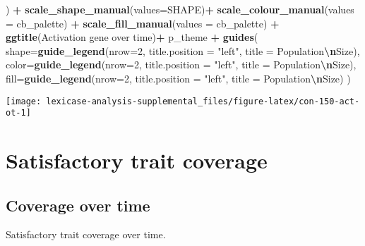 \documentclass[
]{book}
\newenvironment{Shaded}{\begin{snugshade}}{\end{snugshade}}
\newcommand{\AttributeTok}[1]{\textcolor[rgb]{0.13,0.29,0.53}{#1}}
\newcommand{\DecValTok}[1]{\textcolor[rgb]{0.00,0.00,0.81}{#1}}
\newcommand{\FunctionTok}[1]{\textcolor[rgb]{0.13,0.29,0.53}{\textbf{#1}}}
\newcommand{\NormalTok}[1]{#1}
\newcommand{\SpecialCharTok}[1]{\textcolor[rgb]{0.81,0.36,0.00}{\textbf{#1}}}
\newcommand{\StringTok}[1]{\textcolor[rgb]{0.31,0.60,0.02}{#1}}
\begin{document}
\begin{Shaded}
\begin{Highlighting}[]
\NormalTok{  ) }\SpecialCharTok{+}
  \FunctionTok{scale\_shape\_manual}\NormalTok{(}\AttributeTok{values=}\NormalTok{SHAPE)}\SpecialCharTok{+}
  \FunctionTok{scale\_colour\_manual}\NormalTok{(}\AttributeTok{values =}\NormalTok{ cb\_palette) }\SpecialCharTok{+}
  \FunctionTok{scale\_fill\_manual}\NormalTok{(}\AttributeTok{values =}\NormalTok{ cb\_palette) }\SpecialCharTok{+}
  \FunctionTok{ggtitle}\NormalTok{(}\StringTok{\textquotesingle{}Activation gene over time\textquotesingle{}}\NormalTok{)}\SpecialCharTok{+}
\NormalTok{  p\_theme }\SpecialCharTok{+}
  \FunctionTok{guides}\NormalTok{(}
    \AttributeTok{shape=}\FunctionTok{guide\_legend}\NormalTok{(}\AttributeTok{nrow=}\DecValTok{2}\NormalTok{, }\AttributeTok{title.position =} \StringTok{"left"}\NormalTok{, }\AttributeTok{title =} \StringTok{\textquotesingle{}Population}\SpecialCharTok{\textbackslash{}n}\StringTok{Size\textquotesingle{}}\NormalTok{),}
    \AttributeTok{color=}\FunctionTok{guide\_legend}\NormalTok{(}\AttributeTok{nrow=}\DecValTok{2}\NormalTok{, }\AttributeTok{title.position =} \StringTok{"left"}\NormalTok{, }\AttributeTok{title =} \StringTok{\textquotesingle{}Population}\SpecialCharTok{\textbackslash{}n}\StringTok{Size\textquotesingle{}}\NormalTok{),}
    \AttributeTok{fill=}\FunctionTok{guide\_legend}\NormalTok{(}\AttributeTok{nrow=}\DecValTok{2}\NormalTok{, }\AttributeTok{title.position =} \StringTok{"left"}\NormalTok{, }\AttributeTok{title =} \StringTok{\textquotesingle{}Population}\SpecialCharTok{\textbackslash{}n}\StringTok{Size\textquotesingle{}}\NormalTok{)}
\NormalTok{  )}
\end{Highlighting}
\end{Shaded}

\texttt{[image: lexicase-analysis-supplemental\_files/figure-latex/con-150-act-ot-1]}

\hypertarget{satisfactory-trait-coverage}{%
\section{Satisfactory trait coverage}\label{satisfactory-trait-coverage}}

\hypertarget{coverage-over-time-1}{%
\subsection{Coverage over time}\label{coverage-over-time-1}}

Satisfactory trait coverage over time.
\end{document}
